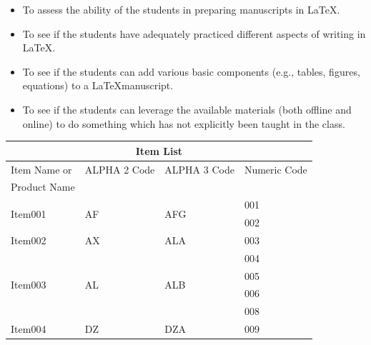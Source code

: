 \documentclass[12pt, a4paper]{article}
\begin{document}
	\begin{itemize}
		\item\LARGE To assess the ability of the students in preparing
		manuscripts in \LaTeX.
		\item\Large To see if the students have adequately practiced different
		aspects of writing in \LaTeX.
		\item\large To see if the students can add various basic components (e.g., tables, figures, equations) to a \LaTeX manuscript.
		\item\normalsize To see if the students can leverage the available materials (both offline and online) to do something which has not explicitly been taught in the class.
	\end{itemize}

\pagebreak

	\begin{table}
	\begin{tabular}{|l||l|l|l|}
		\hline 
		
		\multicolumn{4}{|c|}{Item List} \\
		\hline 
		
		Item Name or &
		ALPHA 2 Code &
		ALPHA 3 Code &
		Numeric Code \\
		
		Product Name & & & \\
		\hline 
		
		\multirow{2}{*}{Item001}  &
		\multirow{2}{*}{AF}  &
		\multirow{2}{*}{AFG}  &
		001 \\
		
		\multirow{2}{*}{}  &
		\multirow{2}{*}{}  &
		\multirow{2}{*}{}  &
		002 \\
		\hline 
		
		Item002 & 
		AX &
		ALA & 
		003 \\ 
		\hline 
		

		\multirow{4}{*}{Item003}  &
		\multirow{4}{*}{AL}  &
		\multirow{4}{*}{ALB}  &
		004 \\
		
		\multirow{4}{*}{}  &
		\multirow{4}{*}{}  &
		\multirow{4}{*}{}  &
		005 \\
		
		\multirow{4}{*}{}  &
		\multirow{4}{*}{}  &
		\multirow{4}{*}{}  &
		006 \\
		
		\multirow{4}{*}{}  &
		\multirow{4}{*}{}  &
		\multirow{4}{*}{}  &
		008 \\
		\hline
		
		\multirow{2}{*}{Item004}  &
		\multirow{2}{*}{DZ}  &
		\multirow{2}{*}{DZA}  &
		009 \\
		

\end{tabular}
\end{table}
\end{document}
